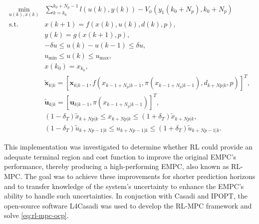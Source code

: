 \begin{equation} \label{eq:rl-mpc-ocp}
	\begin{aligned}
		\min_{u(k),x(k)} & \sum_{k = k_0}^{k_0 + N_p-1} l(u(k), y(k)) - V_{\phi}(y_1(k_0+N_p), k_0+N_p) \\
		\text{s.t.} \quad & x(k+1) = f(x(k), u(k), d(k), p), \\
		& y(k) = g(x(k+1), p), \\
		& -\delta u \leq u(k) - u(k-1) \leq \delta u, \\
		& u_{\min} \leq u(k) \leq u_{\max}, \\
		& x(k_0) = x_{k_0}, \\
		& \tilde{\mathbf{x}}_{k|k} = [\mathbf{x}_{k|k-1}, f(x_{k-1 + N_p|k-1}, \pi(x_{k-1 + N_p|k-1}), d_{k+Np|k}, p)]^T, \\
		& \tilde{\mathbf{u}}_{k|k} = [\mathbf{u}_{k|k-1}, \pi(x_{k-1 + N_p|k-1})]^T, \\
		& (1-\delta_T)\tilde{x}_{k+Np|k} \leq x_{k+Np|k} \leq (1+\delta_T)\tilde{x}_{k+Np|k}, \\
		& (1-\delta_T)\tilde{u}_{k+Np-1|k} \leq u_{k+Np-1|k} \leq (1+\delta_T)\tilde{u}_{k+Np-1|k}.
	\end{aligned}
\end{equation}


This implementation was investigated to determine whether RL could provide an adequate terminal region and cost function to improve the original EMPC's performance, thereby producing a high-performing EMPC, also known as RL-MPC. The goal was to achieve these improvements for shorter prediction horizons and to transfer knowledge of the system's uncertainty to enhance the EMPC's ability to handle such uncertainties. In conjuction with Casadi and IPOPT, the open-source software L4Casadi \cite{salzmannLearningCasADiDatadriven2023,salzmannRealtimeNeuralMPCDeep2023} was used to develop the RL-MPC framework and solve \autoref{eq:rl-mpc-ocp}.

